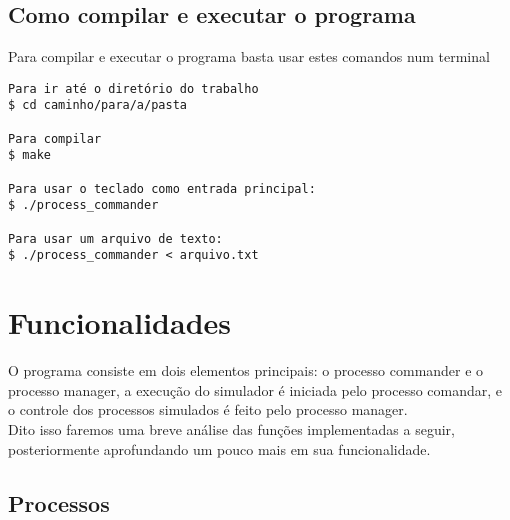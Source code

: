 \documentclass[a4paper, 12pt]{article}
\begin{document}
\subsection{Como compilar e executar o programa}
Para compilar e executar o programa basta usar estes comandos num terminal
\begin{verbatim}
Para ir até o diretório do trabalho
$ cd caminho/para/a/pasta

Para compilar
$ make

Para usar o teclado como entrada principal:
$ ./process_commander

Para usar um arquivo de texto:
$ ./process_commander < arquivo.txt
\end{verbatim}
\newpage

\section{Funcionalidades}
O programa consiste em dois elementos principais: o processo commander e o processo manager, a execução do simulador é iniciada pelo processo comandar, e o controle dos processos simulados é feito pelo processo manager. \\
Dito isso faremos uma breve análise das funções implementadas a seguir, posteriormente aprofundando um pouco mais em sua funcionalidade.

\subsection{Processos}
\end{document}

